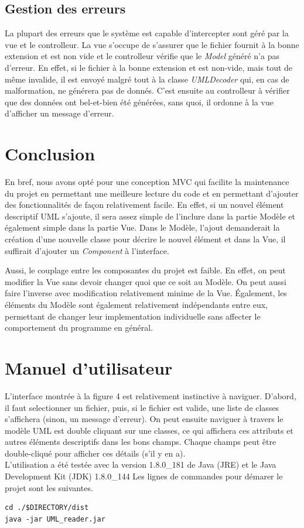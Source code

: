 \documentclass[12pt]{article} %
\begin{document}
\subsection{Gestion des erreurs}
La plupart des erreurs que le système est capable d'intercepter sont géré par la vue et le controlleur.  La vue s'occupe de s'assurer que le fichier fournit à la bonne extension et est non vide et le controlleur vérifie que le \textit{Model} généré n'a pas d'erreur.  En effet, si le fichier à la bonne extension et est non-vide, mais tout de même invalide, il est envoyé malgré tout à la classe \textit{UMLDecoder} qui, en cas de malformation, ne générera pas de donnés.  C'est ensuite au controlleur à vérifier que des données ont bel-et-bien été générées, sans quoi, il ordonne à la vue d'afficher un message d'erreur.

\section{Conclusion}
En bref, nous avons opté pour une conception MVC qui facilite la maintenance du projet en permettant une meilleure lecture du code et en permettant d'ajouter des fonctionnalités de façon relativement facile.  En effet, si un nouvel élément descriptif UML s'ajoute, il sera assez simple de l'inclure dans la partie Modèle et également simple dans la partie Vue.   Dans le Modèle, l'ajout demanderait la création d'une nouvelle classe pour décrire le nouvel élément et dans la Vue, il suffirait d'ajouter un \textit{Component} à l'interface.

Aussi, le couplage entre les composantes du projet est faible.  En effet, on peut modifier la Vue sans devoir changer quoi que ce soit au Modèle.  On peut aussi faire l'inverse avec modification relativement minime de la Vue.  Également, les éléments du Modèle sont également relativement indépendants entre eux, permettant de changer leur implementation individuelle sans affecter le comportement du programme en général.

\section{Manuel d'utilisateur}
L'interface montrée à la figure 4 est relativement instinctive à naviguer.  D'abord, il faut selectionner un fichier, puis, si le fichier est valide, une liste de classes s'affichera (sinon, un message d'erreur).  On peut ensuite naviguer à travers le modèle UML est double cliquant sur une classes, ce qui affichera ces attributs et autres éléments descriptifs dans les bons champs.  Chaque champs peut être double-cliqué pour afficher ces détails (s'il y en a).
\\

L'utilisation a été testée avec la version 1.8.0\_181 de Java (JRE) et le Java Development Kit (JDK) 1.8.0\_144
Les lignes de commandes pour démarer le projet sont les suivantes.
\begin{lstlisting}
cd ./$DIRECTORY/dist
java -jar UML_reader.jar
\end{lstlisting}
\end{document}
